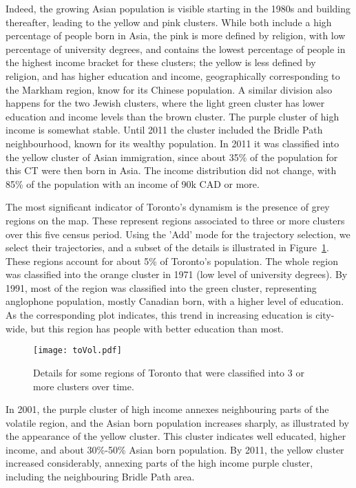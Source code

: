 Indeed, the growing Asian population is visible starting in the 1980s and
building thereafter, leading to the yellow and pink clusters. While both include
a high percentage of people born in Asia, the pink is more defined by religion,
with low percentage of university degrees, and contains the lowest percentage of
people in the highest income bracket for these clusters; the yellow is less
defined by religion, and has higher education and income, geographically
corresponding to the Markham region, know for its Chinese population. A similar
division also happens for the two Jewish clusters, where the light green cluster
has lower education and income levels than the brown cluster. The purple cluster
of high income is somewhat stable. Until 2011 the cluster included the Bridle Path
neighbourhood, known for its wealthy population. In 2011 it was
classified into the yellow cluster of Asian immigration, since about 35\% of the
population for this CT were then born in Asia. The income distribution did not
change, with 85\% of the population with an income of 90k CAD or more.


The most significant indicator of Toronto's dynamism is the presence of grey
regions on the map. These represent regions associated to three or more clusters
over this five census period. Using the 'Add' mode for the trajectory selection,
we select their trajectories, and a subset of the details is illustrated in
Figure~\ref{fig:toVol}. These regions account for about 5\% of Toronto's
population. The whole region was classified into the orange cluster in 1971 (low
level of university degrees). By 1991, most of the region was classified into
the green cluster, representing anglophone population, mostly Canadian born,
with a higher level of education. As the corresponding plot indicates, this
trend in increasing education is city-wide, but this region has people with
better education than most.

\begin{figure}
    \centering 
    \texttt{[image: toVol.pdf]}
    \caption{Details for some regions of Toronto that were classified into 3 or
         more clusters over time.\label{fig:toVol}}
\end{figure}

In 2001, the purple cluster of high income annexes neighbouring parts of the
volatile region, and the Asian born population increases sharply, as illustrated
by the appearance of the yellow cluster.  This cluster indicates well educated,
higher income, and about 30\%-50\% Asian born population. By 2011, the yellow
cluster increased considerably, annexing parts of the high income purple
cluster, including the neighbouring Bridle Path area.

